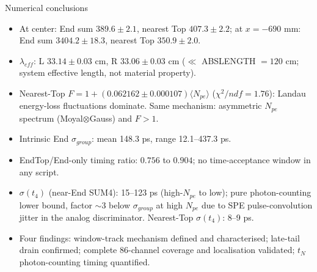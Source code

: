 \documentclass[aspectratio=169]{beamer}
\begin{document}
\begin{frame}{Numerical conclusions}

\small\begin{itemize}
 \item At center: End sum $389.6\pm2.1$, nearest Top $407.3\pm2.2$;
       at $x=-690$ mm: End sum $3404.2\pm18.3$, nearest Top $350.9\pm2.0$.
 \item $\lambda_{eff}$: L $33.14\pm0.03$ cm,
       R $33.06\pm0.03$ cm
       ($\ll$ ABSLENGTH $=120$ cm; system effective length, not material property).
 \item Nearest-Top $F=1+(0.062162\pm0.000107)\langle N_{pe}\rangle$
       ($\chi^2/ndf=1.76$): Landau energy-loss fluctuations dominate.
       Same mechanism: asymmetric $N_{pe}$ spectrum (Moyal$\otimes$Gauss) and $F>1$.
 \item Intrinsic End $\sigma_{group}$: mean 148.3 ps,
       range 12.1--437.3 ps.
 \item EndTop/End-only timing ratio: $0.756$
       to $0.904$; no time-acceptance window in any script.
 \item $\sigma(t_4)$ (near-End SUM4): 15--123 ps (high-$N_{pe}$ to low); pure photon-counting lower bound, factor $\sim3$ below $\sigma_{group}$ at high $N_{pe}$ due to SPE pulse-convolution jitter in the analog discriminator. Nearest-Top $\sigma(t_4)$: 8--9 ps.
 \item Four findings: window-track mechanism defined and characterised; late-tail drain confirmed;
       complete 86-channel coverage and localisation validated; $t_N$ photon-counting timing quantified.
\end{itemize}

\end{frame}
\end{document}
